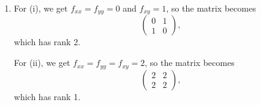\documentclass[twoside,10pt]{report}
\begin{document}
\begin{enumerate}
	\item For (i), we get $f_{xx}=f_{yy}=0$ and $f_{xy}=1$, so the matrix becomes
		\[
		\begin{pmatrix}
			0&1\\
			1&0
		\end{pmatrix},
	\] which has rank 2.

	For (ii), we get $f_{xx}=f_{yy}=f_{xy}=2$, so the matrix becomes
	\[
	\begin{pmatrix}
		2&2\\
		2&2
	\end{pmatrix},
	\] which has rank 1.
\end{enumerate}
\end{document}
